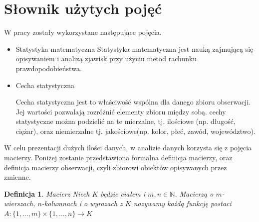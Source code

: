 \documentclass[12pt,a4paper]{report}
\newtheorem{definition}[theorem]{Definicja}
\begin{document}
\begin{itemize}


\end{itemize}


\section{Słownik użytych pojęć}
W pracy zostały wykorzystane następujące pojęcia.
\begin{itemize}
\item Statystyka matematyczna \cite[w oparciu o rozdział 1]{krysicki1999}
Statystyka matematyczna jest nauką zajmującą się opisywaniem i analizą zjawisk przy użyciu metod rachunku prawdopodobieństwa. 


 
 
\item Cecha statystyczna \cite[Rozdział 1]{krysicki1999}

Cecha statystyczna jest to właściwość wspólna dla danego zbioru obserwacji. Jej wartości pozwalają rozróżnić elementy zbioru między sobą. cechy statystyczne można podzielić na te mierzalne, tj. ilościowe (np. długość, ciężar), oraz niemierzalne tj. jakościowe(np. kolor, płeć, zawód, województwo).

\end{itemize}

W celu prezentacji dużych ilości danych, w analizie danych korzysta się z pojęcia macierzy. Poniżej zostanie przedstawiona formalna definicja macierzy, oraz definicja macierzy obserwacji, czyli zbiorowi obiektów opisywanych przez zmienne. %

\begin{definition}{Macierz \cite[Rozdział 1]{banaszak2002}}
Niech $K$ będzie ciałem i $m, n \in \mathbb{N}$. Macierzą o $m$-wierszach, $n$-kolumnach i o wyrazach z $K$ nazywamy każdą funkcję postaci
$A: \{1,\ldots, m \} \times \{1, \ldots, n\} \rightarrow K$

\end{definition}
\end{document}
